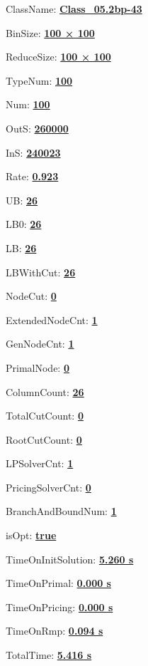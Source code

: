 \documentclass[11pt]{article}
\begin{document}
\pagestyle{empty}


ClassName: \underline{\textbf{Class_05.2bp-43}}
\par
BinSize: \underline{\textbf{100 × 100}}
\par
ReduceSize: \underline{\textbf{100 × 100}}
\par
TypeNum: \underline{\textbf{100}}
\par
Num: \underline{\textbf{100}}
\par
OutS: \underline{\textbf{260000}}
\par
InS: \underline{\textbf{240023}}
\par
Rate: \underline{\textbf{0.923}}
\par
UB: \underline{\textbf{26}}
\par
LB0: \underline{\textbf{26}}
\par
LB: \underline{\textbf{26}}
\par
LBWithCut: \underline{\textbf{26}}
\par
NodeCut: \underline{\textbf{0}}
\par
ExtendedNodeCnt: \underline{\textbf{1}}
\par
GenNodeCnt: \underline{\textbf{1}}
\par
PrimalNode: \underline{\textbf{0}}
\par
ColumnCount: \underline{\textbf{26}}
\par
TotalCutCount: \underline{\textbf{0}}
\par
RootCutCount: \underline{\textbf{0}}
\par
LPSolverCnt: \underline{\textbf{1}}
\par
PricingSolverCnt: \underline{\textbf{0}}
\par
BranchAndBoundNum: \underline{\textbf{1}}
\par
isOpt: \underline{\textbf{true}}
\par
TimeOnInitSolution: \underline{\textbf{5.260 s}}
\par
TimeOnPrimal: \underline{\textbf{0.000 s}}
\par
TimeOnPricing: \underline{\textbf{0.000 s}}
\par
TimeOnRmp: \underline{\textbf{0.094 s}}
\par
TotalTime: \underline{\textbf{5.416 s}}
\par
\newpage


\end{document}
